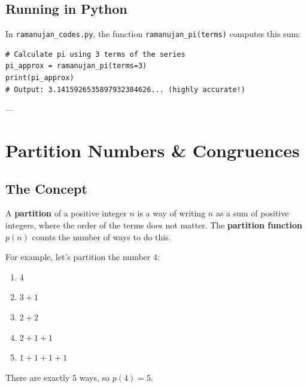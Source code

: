 \documentclass[11pt]{article}
\begin{document}
\subsection{Running in Python}
In \texttt{ramanujan\_codes.py}, the function \texttt{ramanujan\_pi(terms)} computes this sum:
\begin{lstlisting}
# Calculate pi using 3 terms of the series
pi_approx = ramanujan_pi(terms=3)
print(pi_approx) 
# Output: 3.1415926535897932384626... (highly accurate!)
\end{lstlisting}

---

\section{Partition Numbers \& Congruences}

\subsection{The Concept}
A \textbf{partition} of a positive integer $n$ is a way of writing $n$ as a sum of positive integers, where the order of the terms does not matter. The \textbf{partition function} $p(n)$ counts the number of ways to do this.

For example, let's partition the number $4$:
\begin{enumerate}
    \item $4$
    \item $3 + 1$
    \item $2 + 2$
    \item $2 + 1 + 1$
    \item $1 + 1 + 1 + 1$
\end{enumerate}
There are exactly $5$ ways, so $p(4) = 5$.
\end{document}
